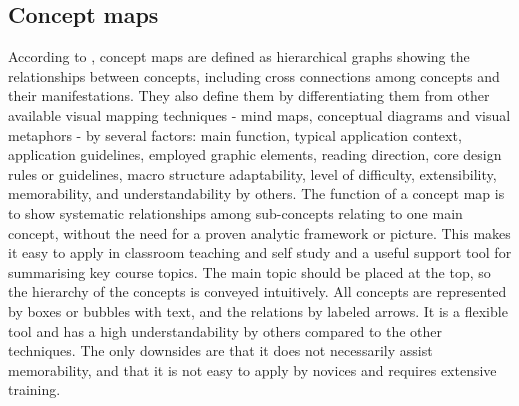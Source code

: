 \subsection{Concept maps}


According to , concept maps are defined as hierarchical graphs showing the relationships between concepts, including cross connections among concepts and their manifestations. They also define them by differentiating them from other available visual mapping techniques - mind maps, conceptual diagrams and visual metaphors - by several factors: main function, typical application context, application guidelines, employed graphic elements, reading direction, core design rules or guidelines, macro structure adaptability, level of difficulty, extensibility, memorability, and understandability by others. The function of a concept map is to show systematic relationships among sub-concepts relating to one main concept, without the need for a proven analytic framework or picture. This makes it easy to apply in classroom teaching and self study and a useful support tool for summarising key course topics. The main topic should be placed at the top, so the hierarchy of the concepts is conveyed intuitively. All concepts are represented by boxes or bubbles with text, and the relations by labeled arrows. It is a flexible tool and has a high understandability by others compared to the other techniques. The only downsides are that it does not necessarily assist memorability, and that it is not easy to apply by novices and requires extensive training.


